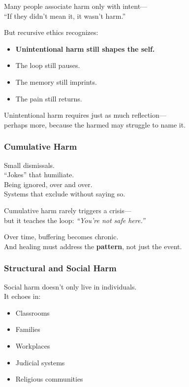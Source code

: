 Many people associate harm only with intent---\\
``If they didn't mean it, it wasn't harm.''

But recursive ethics recognizes:

\begin{itemize}
\item
  \textbf{Unintentional harm still shapes the self.\\
  }
\item
  The loop still pauses.
\item
  The memory still imprints.
\item
  The pain still returns.
\end{itemize}

Unintentional harm requires just as much reflection---\\
perhaps more, because the harmed may struggle to name it.

\subsubsection{\texorpdfstring{\textbf{Cumulative
Harm}}{Cumulative Harm}}\label{cumulative-harm}

Small dismissals.\\
``Jokes'' that humiliate.\\
Being ignored, over and over.\\
Systems that exclude without saying so.

Cumulative harm rarely triggers a crisis---\\
but it teaches the loop: \emph{``You're not safe here.''}

Over time, buffering becomes chronic.\\
And healing must address the \textbf{pattern}, not just the event.

\subsubsection{\texorpdfstring{\textbf{Structural and Social
Harm}}{Structural and Social Harm}}\label{structural-and-social-harm}

Social harm doesn't only live in individuals.\\
It echoes in:

\begin{itemize}
\item
  Classrooms
\item
  Families
\item
  Workplaces
\item
  Judicial systems
\item
  Religious communities
\end{itemize}

